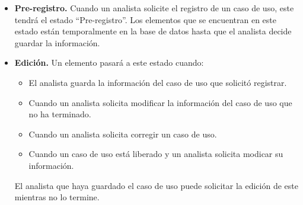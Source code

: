 \begin{itemize}
 \item {\bf Pre-registro.} Cuando un analista solicite el registro de un caso de uso, este tendrá el estado ``Pre-registro''.
 Los elementos que se encuentran en este estado están temporalmente en la base de datos hasta que el analista decide guardar la información.
 
 \item {\bf Edición.} Un elemento pasará a este estado cuando: 
 \begin{itemize}
  \item El analista guarda la información del caso de uso que solicitó registrar.
  \item Cuando un analista solicita modificar la información del caso de uso que no ha terminado.
  \item Cuando un analista solicita corregir un caso de uso.
  \item Cuando un caso de uso está liberado y un analista solicita modicar su información.
 \end{itemize}
 El analista que haya guardado el caso de uso puede solicitar la edición de este mientras no lo termine.
 

\end{itemize}
